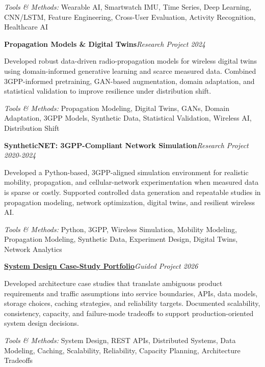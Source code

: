 \documentclass[9pt,letterpaper]{extarticle}
\newcommand{\entry}[2]{\Needspace{4\baselineskip}\textbf{#1}\hfill\textit{#2}\par}
\begin{document}
{\small\textit{Tools \& Methods:} Wearable AI, Smartwatch IMU, Time Series, Deep Learning, CNN/LSTM, Feature Engineering, Cross-User Evaluation, Activity Recognition, Healthcare AI\par}
\vspace{1pt}
\entry{Propagation Models \& Digital Twins}{Research Project \textbar{} 2024}
Developed robust data-driven radio-propagation models for wireless digital twins using domain-informed generative learning and scarce measured data. Combined 3GPP-informed pretraining, GAN-based augmentation, domain adaptation, and statistical validation to improve resilience under distribution shift.\par
{\small\textit{Tools \& Methods:} Propagation Modeling, Digital Twins, GANs, Domain Adaptation, 3GPP Models, Synthetic Data, Statistical Validation, Wireless AI, Distribution Shift\par}
\vspace{1pt}
\entry{SyntheticNET: 3GPP-Compliant Network Simulation}{Research Project \textbar{} 2020-2024}
Developed a Python-based, 3GPP-aligned simulation environment for realistic mobility, propagation, and cellular-network experimentation when measured data is sparse or costly. Supported controlled data generation and repeatable studies in propagation modeling, network optimization, digital twins, and resilient wireless AI.\par
{\small\textit{Tools \& Methods:} Python, 3GPP, Wireless Simulation, Mobility Modeling, Propagation Modeling, Synthetic Data, Experiment Design, Digital Twins, Network Analytics\par}
\vspace{1pt}
\entry{\href{https://github.com/WaseemRaza844/system-design-masterclass}{System Design Case-Study Portfolio}}{Guided Project \textbar{} 2026}
Developed architecture case studies that translate ambiguous product requirements and traffic assumptions into service boundaries, APIs, data models, storage choices, caching strategies, and reliability targets. Documented scalability, consistency, capacity, and failure-mode tradeoffs to support production-oriented system design decisions.\par
{\small\textit{Tools \& Methods:} System Design, REST APIs, Distributed Systems, Data Modeling, Caching, Scalability, Reliability, Capacity Planning, Architecture Tradeoffs\par}
\vspace{1pt}
\end{document}
